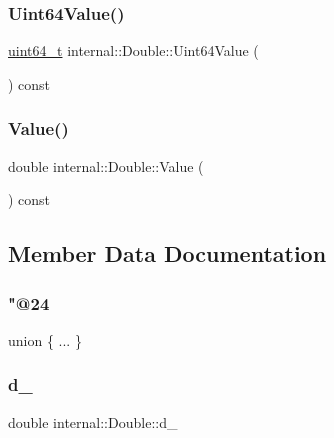 \subsubsection{\texorpdfstring{Uint64\+Value()}{Uint64Value()}}
{\footnotesize\ttfamily \hyperlink{stdint_8h_aec6fcb673ff035718c238c8c9d544c47}{uint64\+\_\+t} internal\+::\+Double\+::\+Uint64\+Value (\begin{DoxyParamCaption}{ }\end{DoxyParamCaption}) const\hspace{0.3cm}{\ttfamily [inline]}}

\mbox{\label{classinternal_1_1Double_a665c64824d1046528cbc4066a9ed0ef8}} 
\subsubsection{\texorpdfstring{Value()}{Value()}}
{\footnotesize\ttfamily double internal\+::\+Double\+::\+Value (\begin{DoxyParamCaption}{ }\end{DoxyParamCaption}) const\hspace{0.3cm}{\ttfamily [inline]}}



\subsection{Member Data Documentation}
\mbox{\label{classinternal_1_1Double_a01f0bc70c07b670156d5350f0ed9cd14}} 
\subsubsection{\texorpdfstring{"@24}{@24}}
{\footnotesize\ttfamily union \{ ... \} \hspace{0.3cm}{\ttfamily [private]}}

\mbox{\label{classinternal_1_1Double_a9ed5b5245664da8abe6cdeefaed6452e}} 
\subsubsection{\texorpdfstring{d\+\_\+}{d\_}}
{\footnotesize\ttfamily double internal\+::\+Double\+::d\+\_\+}


